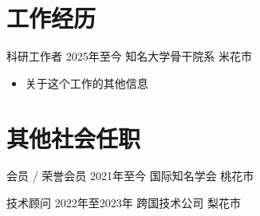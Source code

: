 \documentclass[a4paper,11pt]{article}
\begin{document}

\makeheader %

%
%
\begin{acmedia}
	\EntrySeparator
	\EntrySeparator
	\EntrySeparator
\end{acmedia}



\section{工作经历}


\experience
	{科研工作者}
	{2025年至今}
	{知名大学骨干院系}
	{米花市}
	{\begin{itemize}
		\item[-] 关于这个工作的其他信息
	\end{itemize}}


\section{其他社会任职}

\experience
	{会员 / 荣誉会员}
	{2021年至今}
	{国际知名学会}
	{桃花市}{}

\experience
	{技术顾问}
	{2022年至2023年}
	{跨国技术公司}
	{梨花市}{}

\end{document}
